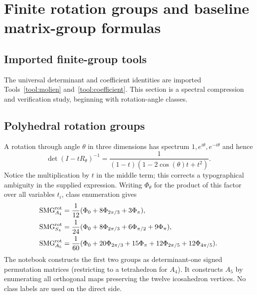\documentclass[10pt]{article}
\newcommand{\Sym}{\operatorname{Sym}}
\newcommand{\SMG}{\operatorname{SMG}}
\newcommand{\MGF}{\SMG}
\begin{document}
\section{Finite rotation groups and baseline matrix-group formulas}\label{proof:finite-matrix-groups}
\begingroup
\providecommand{\Sym}{\operatorname{Sym}}
\renewcommand{\Sym}{\operatorname{Sym}}
\providecommand{\EE}{\mathbb E}
\renewcommand{\EE}{\mathbb E}
\setcounter{theorem}{0}
\setcounter{proposition}{0}
\setcounter{lemma}{0}
\setcounter{corollary}{0}
\setcounter{remark}{0}
\begin{abstract}
We verify finite-group instances of the generalized Molien formula by full
matrix enumeration.  The examples cover the tetrahedral, octahedral, and
icosahedral rotation representations; the full $H_3$ reflection group;
restricted monomial groups including $G(r,p,n)$; an exterior-power
representation; and a regular representation.  In total, 492 coefficient
comparisons pass, together with independent Reynolds-projector checks.  A
dual-code cycle counter for monomial groups is included as a reusable tool.
\end{abstract}

\subsection{Imported finite-group tools}
The universal determinant and coefficient identities are imported
Tools~\ref{tool:molien} and~\ref{tool:coefficient}. This section is a spectral
compression and verification study, beginning with rotation-angle classes.

\subsection{Polyhedral rotation groups}
A rotation through angle $\theta$ in three dimensions has spectrum
$1,e^{i\theta},e^{-i\theta}$ and hence
\[
 \det(I-tR_\theta)^{-1}
 =\frac1{(1-t)(1-2\cos(\theta)t+t^2)}.
\]
Notice the multiplication by $t$ in the middle term; this corrects a
typographical ambiguity in the supplied expression.  Writing $\Phi_\theta$
for the product of this factor over all variables $t_i$, class enumeration
gives
\begin{align*}
 \MGF_{A_4}^{\rm rot}
 &=\frac1{12}(\Phi_0+8\Phi_{2\pi/3}+3\Phi_\pi),\\
 \MGF_{S_4}^{\rm rot}
 &=\frac1{24}(\Phi_0+8\Phi_{2\pi/3}+6\Phi_{\pi/2}+9\Phi_\pi),\\
 \MGF_{A_5}^{\rm rot}
 &=\frac1{60}(\Phi_0+20\Phi_{2\pi/3}+15\Phi_\pi
 +12\Phi_{2\pi/5}+12\Phi_{4\pi/5}).
\end{align*}
The notebook constructs the first two groups as determinant-one signed
permutation matrices (restricting to a tetrahedron for $A_4$).  It constructs
$A_5$ by enumerating all orthogonal maps preserving the twelve icosahedron
vertices.  No class labels are used on the direct side.
\end{document}

